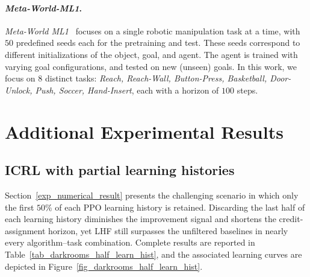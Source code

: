 \documentclass{article}
\begin{document}
\paragraph{\textit{Meta-World-ML1}.}
%
\textit{Meta-World ML1}~\cite{yu2020meta} focuses on a single robotic manipulation task at a time, with $50$ predefined seeds each for the pretraining and test. These seeds correspond to different initializations of the object, goal, and agent. The agent is trained with varying goal configurations, and tested on new (unseen) goals. 
%
In this work, we focus on $8$ distinct tasks: \textit{Reach, Reach-Wall, Button-Press, Basketball, Door-Unlock, Push, Soccer, Hand-Insert}, each with a horizon of $100$ steps.













\section{Additional Experimental Results}



\subsection{ICRL with partial learning histories}
\label{append_addition_result_half_learn_hist}

Section~\ref{exp_numerical_result} presents the challenging scenario in which only the first \(50\%\) of each PPO learning history is retained.  
Discarding the last half of each learning history diminishes the improvement signal and shortens the credit-assignment horizon, yet LHF still surpasses the unfiltered baselines in nearly every algorithm–task combination. 
Complete results are reported in
Table~\ref{tab_darkrooms_half_learn_hist}, and the associated learning curves are depicted in Figure~\ref{fig_darkrooms_half_learn_hist}.
\end{document}
